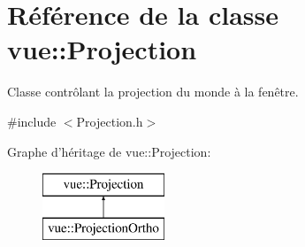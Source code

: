 \hypertarget{classvue_1_1_projection}{\section{Référence de la classe vue\-:\-:Projection}
\label{classvue_1_1_projection}
}


Classe contrôlant la projection du monde à la fenêtre.  




{\ttfamily \#include $<$Projection.\-h$>$}

Graphe d'héritage de vue\-:\-:Projection\-:\begin{figure}[H]
\begin{center}
\leavevmode
\includegraphics[height=2.000000cm]{classvue_1_1_projection}
\end{center}
\end{figure}
